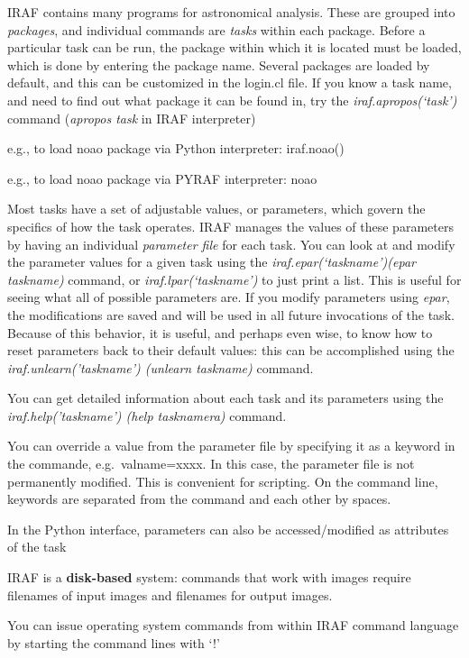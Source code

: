 \documentclass{article}
\begin{document}
IRAF contains many programs for astronomical analysis. These are
grouped into \emph{packages}, and individual commands are
\emph{tasks} within each
package. Before a particular task can be run, the package within which
it is located must be loaded, which is done by entering the package
name. Several packages are loaded by default, and this can be
customized in the login.cl file. If you know a task name, and need to
find out what package it can be found in, try the
\emph{iraf.apropos(`task')}
command (\emph{apropos task} in IRAF interpreter)
\begin{itemize*}
    \item e.g., to load noao package via Python interpreter: iraf.noao()
    \item e.g., to load noao package via PYRAF interpreter: noao
\end{itemize*}
Most tasks have a set of adjustable values, or parameters, which
govern the specifics of how the task operates. IRAF manages the values
of these parameters by having an individual \emph{parameter file} for each
task. You can look at and modify the parameter values for a given task
using the \emph{iraf.epar(`taskname')(epar taskname)} command, or
\emph{iraf.lpar(`taskname')} to just print a list. This is useful for seeing
what all of possible parameters are. If you modify parameters using
\emph{epar}, the modifications are saved and will be used in all future
invocations of the task.
Because of this behavior, it is useful, and perhaps even wise, to know
how to reset parameters back to their default values: this can be
accomplished using the \emph{iraf.unlearn('taskname') (unlearn
taskname)} command.

You can get detailed information about each task and its parameters
using the \emph{iraf.help('taskname') (help tasknamera)} command.

You can override a value from the parameter file by specifying it as a
keyword in the commande, e.g.\ valname=xxxx. In this case, the
parameter file is not permanently modified. This is convenient for
scripting. On the command line, keywords are separated from the
command and each other by spaces.

In the Python interface, parameters can also be accessed/modified as
attributes of the task

IRAF is a \textbf{disk-based} system: commands that work with images require
filenames of input images and filenames for output images.

You can issue operating system commands from within IRAF command
language by starting the command lines with `!'
\end{document}
